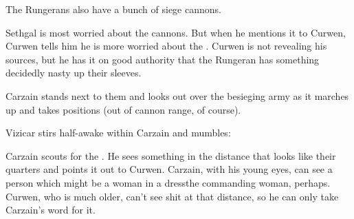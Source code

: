 The Rungerans also have a bunch of siege cannons.

Sethgal is most worried about the cannons. 
But when he mentions it to Curwen, Curwen tells him he is more worried about the \ishrah.
Curwen is not revealing his sources, but he has it on good authority that the Rungeran \ishrah has something decidedly nasty up their sleeves. 





\begin{comment}
  \section{Carzain and Vizicar}
\end{comment}
\new
Carzain stands next to them and looks out over the besieging army as it marches up and takes positions (out of cannon range, of course). 


Vizicar stirs half-awake within Carzain and mumbles: 
  
Carzain scouts for the \ishrah. 
He sees something in the distance that looks like their quarters and points it out to Curwen. 
Carzain, with his young eyes, can see a person which might be a woman in a dress\dash the commanding woman, perhaps. 
Curwen, who is much older, can't see shit at that distance, so he can only take Carzain's word for it. 





